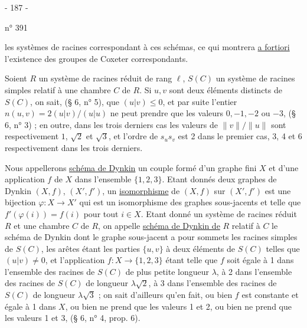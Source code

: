 \begin{center}- 187 -\end{center}
\hfill n° 391

les systèmes de racines correspondant à ces schémas, ce qui montrera \uline{a fortiori} l'existence des groupes de Coxeter correspondants.

Soient $R$ un système de racines réduit de rang $\ell$, $S(C)$ un système de racines simples relatif à une chambre $C$ de $R$. Si $u,v$ sont deux éléments distincts de $S(C)$, on sait, (§ 6, n° 5), que $(u|v)\leq0$, et par suite l'entier $n(u,v)=2(u|v)/(u|u)$ ne peut prendre que les valeurs $0,-1,-2$ ou $-3$, (§ 6, n° 3) ; en outre, dans les trois derniers cas les valeurs de $\|v\|/\|u\|$ sont respectivement $1$, $\sqrt2$ et $\sqrt3$, et l'ordre de $s_us_v$ est 2 dans le premier cas, 3, 4 et 6 respectivement dans les trois derniers.

Nous appellerons \uline{schéma de Dynkin} un couple formé d'un graphe fini $X$ et d'une application $f$ de $X$ dans l'ensemble $\{1,2,3\}$. Etant donnés deux graphes de Dynkin $(X,f)$, $(X',f')$, un \uline{isomorphisme} de $(X,f)$ sur $(X',f')$ est une bijection $\varphi:X\longrightarrow X'$ qui est un isomorphisme des graphes sous-jacents et telle que $f'(\varphi(i))=f(i)$ pour tout $i\in X$. Etant donné un système de racines réduit $R$ et une chambre $C$ de $R$, on appelle \uline{schéma de Dynkin de} $R$ relatif à $C$ le schéma de Dynkin dont le graphe sous-jacent a pour sommets les racines simples de $S(C)$, les arêtes étant les parties $\{u,v\}$ à deux éléments de $S(C)$ telles que $(u|v)\ne0$, et l'application $f:X\longrightarrow\{1,2,3\}$ étant telle que $f$ soit égale à 1 dans l'ensemble des racines de $S(C)$ de plus petite longueur $\lambda$, à 2 dans l'ensemble des racines de $S(C)$ de longueur $\lambda\sqrt2$, à 3 dans l'ensemble des racines de $S(C)$ de longueur $\lambda\sqrt3$ ; on sait d'ailleurs qu'en fait, ou bien $f$ est constante et égale à 1 dans $X$, ou bien ne prend que les valeurs 1 et 2, ou bien ne prend que les valeurs 1 et 3, (§ 6, n° 4, prop. 6).
